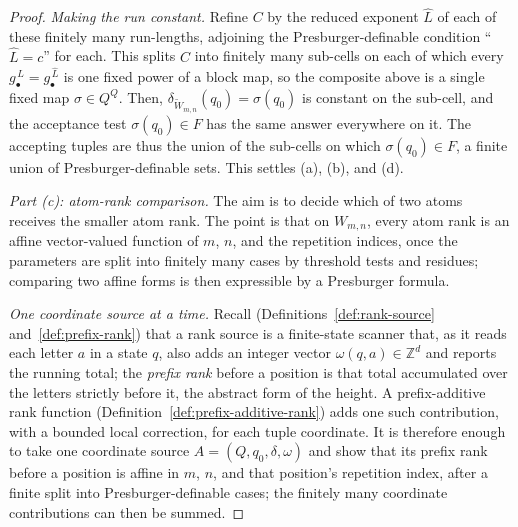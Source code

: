 \documentclass[10pt,a4paper]{amsart}
\newcommand{\Z}{\mathbb Z}
\begin{document}
\begin{proof}
\vspace{0.5em}
\noindent\emph{Making the run constant.}  Refine $C$ by the reduced exponent $\widehat L$
of each of these finitely many run-lengths, adjoining the Presburger-definable condition
``$\widehat L=c$'' for each.  This splits $C$ into finitely many sub-cells on
each of which every $g_\bullet^{\,L}=g_\bullet^{\,\widehat L}$ is one fixed power
of a block map, so the composite above is a single fixed map $\sigma\in Q^Q$.
Then, $\delta_{\widetilde W_{m,n}}(q_0)=\sigma(q_0)$ is constant on the sub-cell,
and the acceptance test $\sigma(q_0)\in F$ has the same answer
everywhere on it.  The accepting tuples are thus the union of the sub-cells on
which $\sigma(q_0)\in F$, a finite union of Presburger-definable sets.  This settles (a),
(b), and (d).

\vspace{0.5em}
\noindent\emph{Part (c): atom-rank comparison.}
The aim is to decide which of two atoms receives the smaller atom rank.  The
point is that on $W_{m,n}$, every atom rank is an affine vector-valued function
of $m$, $n$, and the
repetition indices, once the parameters are split into finitely many cases by threshold
tests and residues; comparing two affine forms is then expressible 
by a Presburger formula.

\vspace{0.5em}
\noindent\emph{One coordinate source at a time.}  Recall
(Definitions~\ref{def:rank-source} and~\ref{def:prefix-rank})
that a rank source is a finite-state scanner that, as it reads each letter $a$
in a state $q$, also adds an integer vector $\omega(q,a)\in\Z^d$ and reports
the running total;
the \emph{prefix rank} before a position is that total accumulated over the
letters strictly before it, the abstract form of the height.  A
prefix-additive rank function
(Definition~\ref{def:prefix-additive-rank}) adds one such contribution, with a
bounded local correction, for each tuple coordinate.  It is therefore enough
to take one coordinate source $A=(Q,q_0,\delta,\omega)$ and show that its
prefix rank before a position is affine in $m$, $n$, and that position's
repetition index, after a finite split into Presburger-definable cases; the finitely many coordinate
contributions can then be summed.


\end{proof}
\end{document}
